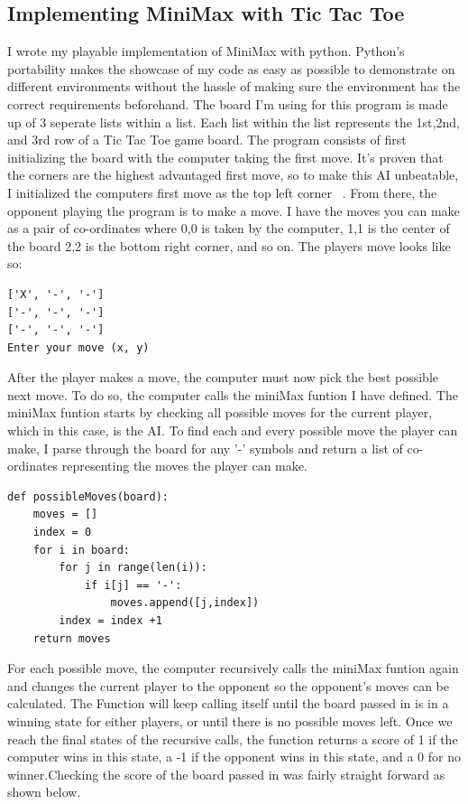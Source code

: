\documentclass[letterpaper]{article}
\begin{document}
\subsection{Implementing MiniMax with Tic Tac Toe}
I wrote my playable implementation of MiniMax with python. Python's portability makes the showcase of my code as easy as possible to demonstrate on different environments without the hassle of making sure the environment has the correct requirements beforehand. The board I'm using for this program is made up of 3 seperate lists within a list. Each list within the list represents the 1st,2nd, and 3rd row of a Tic Tac Toe game board. The program consists of first initializing the board with the computer taking the first move. It's proven that the corners are the highest advantaged first move, so to make this AI unbeatable, I initialized the computers first move as the top left corner ~\cite {wolframdemonstrationsproject_2007}. From there, the opponent playing the program is to make a move. I have the moves you can make as a pair of co-ordinates where 0,0 is taken by the computer, 1,1 is the center of the board 2,2 is the bottom right corner, and so on. The players move looks like so:
\begin{lstlisting}
['X', '-', '-']
['-', '-', '-']
['-', '-', '-']
Enter your move (x, y)
\end{lstlisting}
After the player makes a move, the computer must now pick the best possible next move. To do so, the computer calls the miniMax funtion I have defined. The miniMax funtion starts by checking all possible moves for the current player, which in this case, is the AI. To find each and every possible move the player can make, I parse through the board for any '-' symbols and return a list of co-ordinates representing the moves the player can make.
\begin{lstlisting}
def possibleMoves(board):
    moves = []
    index = 0
    for i in board:
        for j in range(len(i)):
            if i[j] == '-':
                moves.append([j,index])
        index = index +1
    return moves                
\end{lstlisting}
 For each possible move, the computer recursively calls the miniMax funtion again and changes the current player to the opponent so the opponent's moves can be calculated. The Function will keep calling itself until the board passed in is in a winning state for either players, or until there is no possible moves left. Once we reach the final states of the recursive calls, the function returns a score of 1 if the computer wins in this state, a -1 if the opponent wins in this state, and a 0 for no winner.Checking the score of the board passed in was fairly straight forward as shown below.
\end{document}
